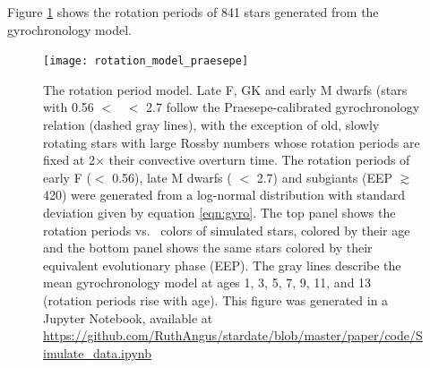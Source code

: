 Figure \ref{fig:rotation_model} shows the rotation periods of 841
stars generated from the gyrochronology model.
\begin{figure}
  \caption{
The rotation period model.
    Late F, GK and early M dwarfs (stars with 0.56 $<$ \gcolor\ $<$ 2.7 follow
    the Praesepe-calibrated gyrochronology relation (dashed gray lines), with
    the exception of old, slowly
    rotating stars with large Rossby numbers whose rotation periods are fixed
    at 2$\times$ their convective overturn time.
    The rotation periods of early F (\gcolor $<$ 0.56), late M dwarfs (\gcolor
    $<$ 2.7) and subgiants (EEP $\gtrsim$ 420) were generated
    from a log-normal distribution with standard deviation given by equation
    \ref{eqn:gyro}.
The top panel shows the rotation periods vs. \gcolor\ colors of simulated stars,
    colored by their age and the bottom panel shows the same stars colored
    by their equivalent evolutionary phase (EEP).
    The gray lines describe the mean gyrochronology model at ages 1,
    3, 5, 7, 9, 11, and 13 (rotation periods rise with age).
    This figure was generated in a Jupyter Notebook, available at
    \url{https://github.com/RuthAngus/stardate/blob/master/paper/code/Simulate_data.ipynb}
}
  \centering
    \texttt{[image: rotation\_model\_praesepe]}
\label{fig:rotation_model}
\end{figure}

